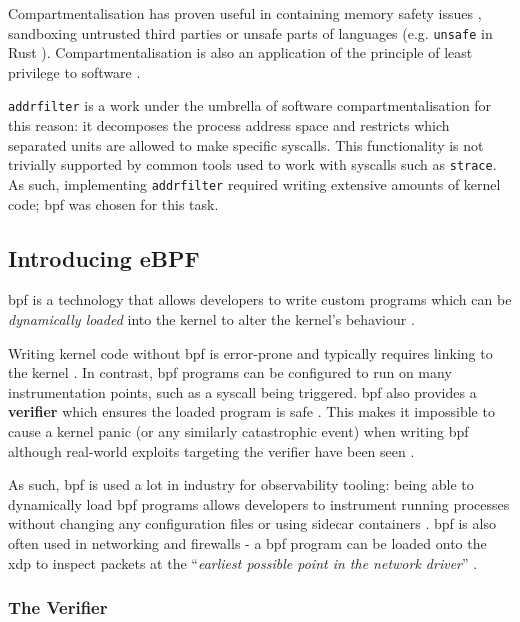 Compartmentalisation has proven useful in containing memory safety issues
\cite{CONFFUZZ},
sandboxing untrusted third parties \cite{ANDROID_SOK} or unsafe parts of
languages \cite{MPK} (e.g.
\texttt{unsafe} in Rust \cite{rustbook_unsafe}). Compartmentalisation is also an
application of the principle of least privilege to software \cite{PRIVMAN}.

\texttt{addrfilter} is a work under the umbrella of software
compartmentalisation for this reason: it decomposes the process address space
and restricts which separated units are allowed to make specific syscalls.
This functionality is not trivially supported by common tools used to work with
syscalls such as \texttt{strace}. As such, implementing \texttt{addrfilter}
required writing extensive amounts of kernel code; \ac{bpf} was chosen for this
task.

\subsection{Introducing eBPF}

\ac{bpf} is a technology that allows developers to write custom programs which
can be \textit{dynamically loaded} into the kernel to alter the kernel's
behaviour \cite{LEARNING_EBPF}. 

Writing kernel code without \ac{bpf} is error-prone and typically
requires linking to the kernel \cite{UNDERSTANDING_LINUX_KERNEL}. In contrast,
\ac{bpf} programs can be configured to run on many instrumentation points, such
as a syscall being triggered. \ac{bpf} also provides a \textbf{verifier} which ensures the  loaded program is safe \cite{LEARNING_EBPF}.
This makes it impossible to cause a kernel panic (or any similarly
catastrophic event) when writing \ac{bpf} although real-world exploits targeting the
verifier have been seen \cite{BPF_VERIFIER_EXPLOIT}. 

As such, \ac{bpf} is used a lot in industry for observability tooling: being able to
dynamically load \ac{bpf} programs allows developers to instrument running processes
without changing any configuration files or using sidecar containers \cite{SIDECAR}.
\ac{bpf} is also often used in networking and firewalls \cite{LINUX_NETWORKING_OBSERVABILITY} - a \ac{bpf} program can
be loaded onto the \ac{xdp} to inspect packets at the ``\textit{earliest possible
point in the network driver}'' \cite{CILIUM_BPF_XDP_INTRO}. 

\subsubsection{The Verifier}


